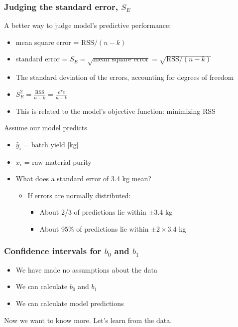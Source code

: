 \begin{frame}\frametitle{Judging the standard error, $S_E$}

	A better way to judge model's predictive performance:
	\begin{itemize}
		\item	mean square error = $\text{RSS}/(n-k)$
		\item	standard error = $S_E = \sqrt{\text{mean square error}} = \sqrt{\text{RSS}/(n-k)}$
		\item	The standard deviation of the errors, accounting for degrees of freedom
		\item	$S_E^2 = \frac{\displaystyle \text{RSS}}{\displaystyle n-k} = \frac{e^Te}{\displaystyle n-k}$
		\item	This is related to the model's objective function: minimizing RSS
	\end{itemize}

	Assume our model predicts
	\begin{itemize}
		\item	$\hat{y}_i$ = batch yield [kg]
		\item	$x_i$ = raw material purity
		\item	What does a standard error of 3.4 kg mean?
		\begin{itemize}
			\item	If errors are normally distributed:
			\begin{itemize}
				\item	About 2/3 of predictions lie within $\pm 3.4$ kg
				\item	About 95\% of predictions lie within $\pm 2 \times 3.4$ kg
			\end{itemize}
		\end{itemize}
	\end{itemize}
\end{frame}

\begin{frame}\frametitle{Confidence intervals for $b_0$ and $b_1$}
	\begin{itemize}
		\item	We have made no assumptions about the data
		\item	We can calculate $b_0$ and $b_1$
		\item	We can calculate model predictions
	\end{itemize}
	
	
	\vspace{12pt}
	Now we want to know more. Let's learn from the data.
\end{frame}


